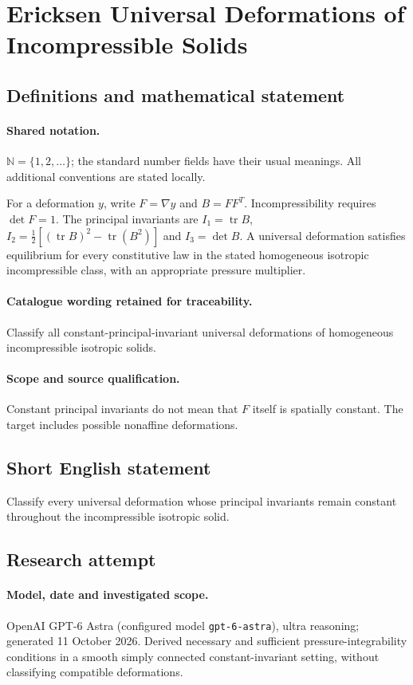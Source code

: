 \documentclass[11pt]{article}
\begin{document}
\section{Ericksen Universal Deformations of Incompressible Solids}\label{statement}

\subsection{Definitions and mathematical statement}

\paragraph{Shared notation.}$\mathbb N=\{1,2,\ldots\}$; the standard number fields have their usual meanings. All additional conventions are stated locally.


For a deformation $y$, write $F=\nabla y$ and $B=FF^T$. Incompressibility requires $\det F=1$. The principal invariants are $I_1=\operatorname{tr}B$, $I_2=\tfrac12[(\operatorname{tr}B)^2-\operatorname{tr}(B^2)]$ and $I_3=\det B$. A universal deformation satisfies equilibrium for every constitutive law in the stated homogeneous isotropic incompressible class, with an appropriate pressure multiplier.

\paragraph{Catalogue wording retained for traceability.}
Classify all constant-principal-invariant universal deformations of homogeneous incompressible isotropic solids.

\paragraph{Scope and source qualification.}Constant principal invariants do not mean that $F$ itself is spatially constant. The target includes possible nonaffine deformations.
\subsection{Short English statement}
Classify every universal deformation whose principal invariants remain constant throughout the incompressible isotropic solid.
\subsection{Research attempt}
\paragraph{Model, date and investigated scope.}
OpenAI GPT-6 Astra (configured model \texttt{gpt-6-astra}), ultra reasoning; generated 11 October 2026. Derived necessary and sufficient pressure-integrability conditions in a smooth simply connected constant-invariant setting, without classifying compatible deformations.
\end{document}
